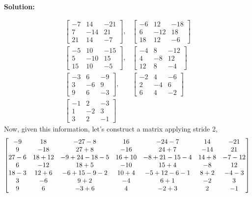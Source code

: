 \documentclass{article}
\newenvironment{solution}
  {\par\noindent\textbf{Solution:}\par}
  {\par}
\begin{document}
\begin{solution}
\[\begin{aligned}
\begin{bmatrix}
-7 & 14 & -21 \\
7 & -14 & 21 \\
21  & 14 & -7
\end{bmatrix} ,& \begin{bmatrix}
-6 & 12 & -18 \\
6 & -12 & 18 \\
18 & 12 & -6
\end{bmatrix} \\ 
\begin{bmatrix}
-5 & 10 & -15 \\
5 & -10 & 15 \\
15 & 10 & -5
\end{bmatrix} ,& \begin{bmatrix}
-4 & 8 & -12 \\
4 & -8 & 12 \\
12 & 8 & -4
\end{bmatrix} \\ 
\begin{bmatrix}
-3 & 6 & -9  \\
3 & -6 & 9 \\
9 & 6 & -3
\end{bmatrix} ,& \begin{bmatrix}
-2 & 4 & -6 \\
2 & -4 & 6 \\
6  & 4 & -2
\end{bmatrix} \\ 
\begin{bmatrix}
-1 & 2 & -3 \\
1 & -2 & 3 \\
3 & 2 & -1
\end{bmatrix}
  \end{aligned}
\]
Now, given this information, let's construct a matrix applying stride 2, 
\[
\begin{bmatrix}
-9 & 18 & -27 -8  & 16 & -24 -7 & 14 & -21 \\ 
9 & -18 & 27 + 8  & -16 & 24+7 & -14 & 21 \\
27-6  & 18+12  & -9 + 24-18-5 & 16 +10 & -8+21-15-4 & 14+8 & -7-12  \\
6 & -12 & 18 +5 & -10 & 15 + 4 & -8 & 12\\
18-3 & 12+6 & -6+15-9-2 & 10+4 & -5 +12-6-1 & 8+2 & -4-3  \\
3 & -6 & 9+2 & -4 & 6+1 & -2 & 3 \\
9 & 6 & -3+6 & 4 & -2+3 & 2 & -1
\end{bmatrix}
\\ 
\]
\end{solution}
\end{document}
